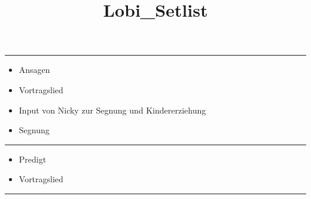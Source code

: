 \documentclass[12pt,a4paper,oneside,final,ngerman]{scrartcl}
\title{Lobi\_Setlist}
\begin{document}
\pagestyle{myheadings}




\hrule
\vspace{1cm}

\begin{itemize}
    \item Ansagen
    \item Vortragslied
    \item Input von Nicky zur Segnung und Kindererziehung
    \item Segnung
\end{itemize}

\newpage




\hrule
\vspace{1cm}

\begin{itemize}
    \item Predigt
    \item Vortragslied
\end{itemize}

% 

\hrule
\end{document}
